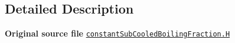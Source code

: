 \subsection{Detailed Description}
{\bfseries Original source file} \href{../../../home/carlo/data/GeN-Foam/GeN-Foam_ffn/GeN-Foam/GeN-Foam/classes/thermalHydraulics/src/physicsModels/heatTransferModels/FSHeatTransferCoefficientModels/subModels/subCooledBoilingFractionModels/constant/constantSubCooledBoilingFraction.H}{\tt constant\+Sub\+Cooled\+Boiling\+Fraction.\+H} 